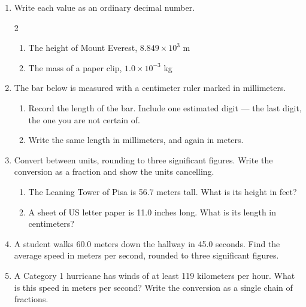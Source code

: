 \documentclass[12pt, twoside]{article}
\begin{document}
\begin{enumerate}[itemsep=0.6cm]
\item Write each value as an ordinary decimal number.
  \begin{multicols}{2}
    \raggedright
    \begin{enumerate}[itemsep=1.5cm]
      \item The height of Mount Everest, $8.849 \times 10^{3}$ m
      \item The mass of a paper clip, $1.0 \times 10^{-3}$ kg
    \end{enumerate}
  \end{multicols}

\newpage

\item The bar below is measured with a centimeter ruler marked in millimeters.

\begin{center}
\end{center}

  \begin{enumerate}[itemsep=0.9cm]
    \item Record the length of the bar. Include one estimated digit --- the last
      digit, the one you are not certain of.
    \item Write the same length in millimeters, and again in meters.
  \end{enumerate} \vspace{0.9cm}

\item Convert between units, rounding to three significant figures. Write the
  conversion as a fraction and show the units cancelling.
  \begin{enumerate}[itemsep=2.0cm]
    \item The Leaning Tower of Pisa is 56.7 meters tall. What is its height in feet?
    \item A sheet of US letter paper is 11.0 inches long. What is its length in
      centimeters?
  \end{enumerate} \vspace{1.8cm}

\item A student walks 60.0 meters down the hallway in 45.0 seconds. Find the
  average speed in meters per second, rounded to three significant figures.
  \vspace{2.0cm}

\item A Category 1 hurricane has winds of at least 119 kilometers per hour. What is
  this speed in meters per second? Write the conversion as a single chain of
  fractions.

\end{enumerate}
\end{document}
